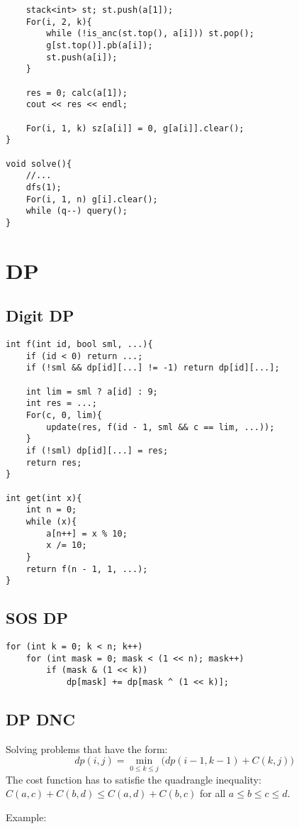 \documentclass[11pt,a4paper]{article}
\begin{document}
\begin{multicols*}{2}
\begin{lstlisting}
	stack<int> st; st.push(a[1]);
	For(i, 2, k){
		while (!is_anc(st.top(), a[i])) st.pop();
		g[st.top()].pb(a[i]);
		st.push(a[i]);
	}
	
	res = 0; calc(a[1]);
	cout << res << endl;
	
	For(i, 1, k) sz[a[i]] = 0, g[a[i]].clear();
}

void solve(){
	//...	
	dfs(1);
	For(i, 1, n) g[i].clear();
	while (q--) query();
}
\end{lstlisting}

\section {DP}
\subsection{Digit DP}
\begin{lstlisting}
int f(int id, bool sml, ...){
    if (id < 0) return ...;
    if (!sml && dp[id][...] != -1) return dp[id][...];

    int lim = sml ? a[id] : 9;
    int res = ...;
    For(c, 0, lim){
        update(res, f(id - 1, sml && c == lim, ...));
    }
    if (!sml) dp[id][...] = res;
    return res;
}

int get(int x){
    int n = 0;
    while (x){
        a[n++] = x % 10;
        x /= 10;
    }
    return f(n - 1, 1, ...);
}
\end{lstlisting}

\subsection{SOS DP}
\begin{lstlisting}
for (int k = 0; k < n; k++)
    for (int mask = 0; mask < (1 << n); mask++)
        if (mask & (1 << k)) 
            dp[mask] += dp[mask ^ (1 << k)];
\end{lstlisting}

\subsection{DP DNC}

Solving problems that have the form:
\[
dp(i, j) =
\min\limits_{0 \le k \le j} \Big( dp(i - 1, k - 1) + C(k, j) \Big)
\]
The cost function has to satisfie the quadrangle inequality:
$C(a, c) + C(b, d) \leq C(a, d) + C(b, c)$ for all $a \leq b \leq c \leq d$.

Example:


\end{multicols*}
\end{document}
